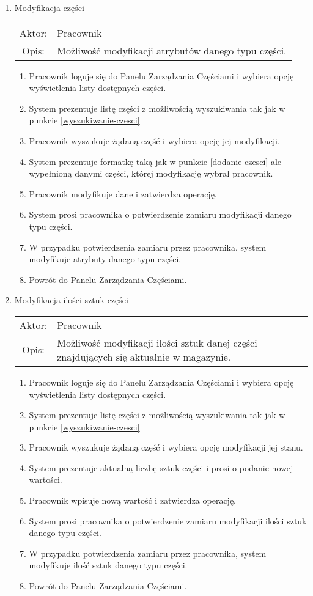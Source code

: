 \begin{enumerate}
  \item Modyfikacja części \\
  \begin{tabularx}{\linewidth}{ c X }
  Aktor: & Pracownik \\
  Opis: & Możliwość modyfikacji atrybutów danego typu części.\\
  \end{tabularx}
   \begin{enumerate}
    \item Pracownik loguje się do Panelu Zarządzania Częściami i wybiera opcję wyświetlenia listy dostępnych części.
    \item System prezentuje listę części z możliwością wyszukiwania tak jak w punkcie \ref{wyszukiwanie-czesci}
    \item Pracownik wyszukuje żądaną część i wybiera opcję jej modyfikacji.
    \item System prezentuje formatkę taką jak w punkcie \ref{dodanie-czesci} ale wypełnioną danymi części, której modyfikację wybrał pracownik.
    \item Pracownik modyfikuje dane i zatwierdza operację.
    \item System prosi pracownika o potwierdzenie zamiaru modyfikacji danego typu części.
    \item W przypadku potwierdzenia zamiaru przez pracownika, system modyfikuje atrybuty danego typu części.
    \item Powrót do Panelu Zarządzania Częściami.
  \end{enumerate}
  
  \item Modyfikacja ilości sztuk części \\
  \begin{tabularx}{\linewidth}{ c X }
  Aktor: & Pracownik \\
  Opis: & Możliwość modyfikacji ilości sztuk danej części znajdujących się aktualnie w magazynie.\\
  \end{tabularx}
   \begin{enumerate}
    \item Pracownik loguje się do Panelu Zarządzania Częściami i wybiera opcję wyświetlenia listy dostępnych części.
    \item System prezentuje listę części z możliwością wyszukiwania tak jak w punkcie \ref{wyszukiwanie-czesci}
    \item Pracownik wyszukuje żądaną część i wybiera opcję modyfikacji jej stanu.
    \item System prezentuje aktualną liczbę sztuk części i prosi o podanie nowej wartości.
    \item Pracownik wpisuje nową wartość i zatwierdza operację.
    \item System prosi pracownika o potwierdzenie zamiaru modyfikacji ilości sztuk danego typu części.
    \item W przypadku potwierdzenia zamiaru przez pracownika, system modyfikuje ilość sztuk danego typu części.
    \item Powrót do Panelu Zarządzania Częściami.
  \end{enumerate}
  

\end{enumerate}
